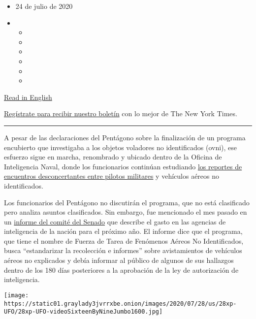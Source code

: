 \begin{itemize}
\item
  24 de julio de 2020
\item
  \begin{itemize}
  \item
  \item
  \item
  \item
  \item
  \item
  \end{itemize}
\end{itemize}

\href{https://www.nytimes3xbfgragh.onion/2020/07/23/us/politics/pentagon-ufo-harry-reid-navy.html}{Read
in English}

\href{https://www.nytimes3xbfgragh.onion/newsletters/el-times}{Regístrate
para recibir nuestro boletín} con lo mejor de The New York Times.

\begin{center}\rule{0.5\linewidth}{\linethickness}\end{center}

A pesar de las declaraciones del Pentágono sobre la finalización de un
programa encubierto que investigaba a los objetos voladores no
identificados (ovni), ese esfuerzo sigue en marcha, renombrado y ubicado
dentro de la Oficina de Inteligencia Naval, donde los funcionarios
continúan estudiando
\href{https://www.nytimes3xbfgragh.onion/2020/04/28/us/pentagon-ufo-videos.html}{los
reportes de encuentros desconcertantes entre pilotos militares} y
vehículos aéreos no identificados.

Los funcionarios del Pentágono no discutirán el programa, que no está
clasificado pero analiza asuntos clasificados. Sin embargo, fue
mencionado el mes pasado en un
\href{https://www.govinfo.gov/content/pkg/CRPT-116srpt233/pdf/CRPT-116srpt233.pdf}{informe
del comité del Senado} que describe el gasto en las agencias de
inteligencia de la nación para el próximo año. El informe dice que el
programa, que tiene el nombre de Fuerza de Tarea de Fenómenos Aéreos No
Identificados, busca ``estandarizar la recolección e informes'' sobre
avistamientos de vehículos aéreos no explicados y debía informar al
público de algunos de sus hallazgos dentro de los 180 días posteriores a
la aprobación de la ley de autorización de inteligencia.

\texttt{[image: https://static01.graylady3jvrrxbe.onion/images/2020/07/28/us/28xp-UFO/28xp-UFO-videoSixteenByNineJumbo1600.jpg]}

